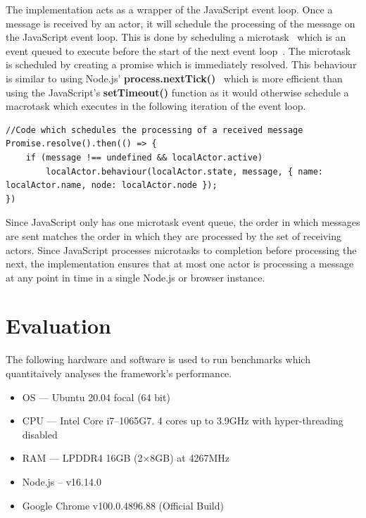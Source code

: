 \documentclass[lettersize,journal]{IEEEtran}
\begin{document}
The implementation acts as a wrapper of the JavaScript event loop. Once a message is received by an actor, it will schedule the processing of the message on the JavaScript event loop. This is done by scheduling a microtask~\cite{microtasks} which is an event queued to execute before the start of the next event loop~\cite{eventloopbrowser}\cite{eventloopnode}. The microtask is scheduled by creating a promise which is immediately resolved. This behaviour is similar to using Node.js' \textbf{process.nextTick()}~\cite{nexttick} which is more efficient than using the JavaScript's \textbf{setTimeout()} function as it would otherwise schedule a macrotask which executes in the following iteration of the event loop.
\begin{lstlisting}
//Code which schedules the processing of a received message
Promise.resolve().then(() => {
    if (message !== undefined && localActor.active)
        localActor.behaviour(localActor.state, message, { name: localActor.name, node: localActor.node });
})
\end{lstlisting}

Since JavaScript only has one microtask event queue, the order in which messages are sent matches the order in which they are processed by the set of receiving actors. Since JavaScript processes microtasks to completion before processing the next, the implementation ensures that at most one actor is processing a message at any point in time in a single Node.js or browser instance.
\section{Evaluation}
The following hardware and software is used to run benchmarks which quantitaively analyses the framework's performance.
\begin{itemize}
    \item OS --- Ubuntu 20.04 focal (64 bit)
    \item CPU --- Intel Core i7--1065G7. 4 cores up to 3.9GHz with hyper-threading disabled
    \item RAM --- LPDDR4 16GB (2$\times$8GB) at 4267MHz
    \item Node.js – v16.14.0
    \item Google Chrome v100.0.4896.88 (Official Build)
\end{itemize}
\end{document}
